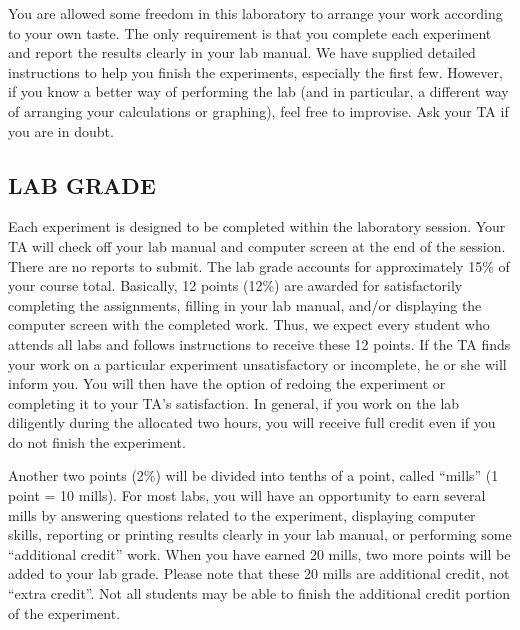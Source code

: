You are allowed some freedom in this laboratory to arrange your work according to your own taste. The only requirement is that you complete each experiment and report the results clearly in your lab manual.  We have supplied detailed instructions to help you finish the experiments, especially the first few.  However, if you know a better way of performing the lab (and in particular, a different way of arranging your calculations or graphing), feel free to improvise.  Ask your TA if you are in doubt.

\begin{comment}
Laboratories are equipped at great expense.  You must therefore exercise care in the use of equipment. Each experiment in the lab manual contains a list of required apparatus. At the beginning of each session, check that all equipment is present and in good condition. Thereafter, you are responsible for any missing or damaged articles. At the end of the session, put your station in order and check the apparatus. By following this procedure, you will relieve yourself of any responsibility for the misdeeds of other students, and will also aid the instructor materially in keeping the laboratory in order.
\end{comment}

\subsection*{LAB GRADE}

Each experiment is designed to be completed within the laboratory session.  Your TA will check off your lab manual and computer screen at the end of the session.  There are no reports to submit.  The lab grade accounts for approximately 15\% of your course total.  Basically, 12 points (12\%) are awarded for satisfactorily completing the assignments, filling in your lab manual, and/or displaying the computer screen with the completed work.  Thus, we expect every student who attends all labs and follows instructions to receive these 12 points.  If the TA finds your work on a particular experiment unsatisfactory or incomplete, he or she will inform you.  You will then have the option of redoing the experiment or completing it to your TA's satisfaction.  In general, if you work on the lab diligently during the allocated two hours, you will receive full credit even if you do not finish the experiment.

Another two points (2\%) will be divided into tenths of a point, called ``mills'' (1 point = 10 mills).  For most labs, you will have an opportunity to earn several mills by answering questions related to the experiment, displaying computer skills, reporting or printing results clearly in your lab manual, or performing some ``additional credit'' work.  When you have earned 20 mills, two more points will be added to your lab grade.  Please note that these 20 mills are additional credit, not ``extra credit''.  Not all students may be able to finish the additional credit portion of the experiment.

